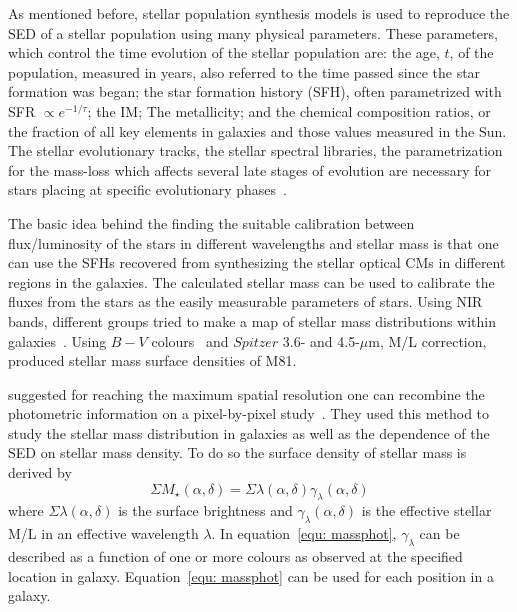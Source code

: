 As mentioned before, stellar population synthesis models is used to reproduce the SED of a stellar population using many physical parameters. 
These parameters, which control the time evolution of the stellar population are:
the age, $t$, of the population, measured in years, also referred to the time passed since the star formation was began;
the star formation history (SFH), often parametrized with SFR $\propto e^{-1/\tau}$; the IM; The metallicity; and the chemical composition ratios, or the fraction of all key elements in galaxies and those values measured in the Sun. 
The stellar evolutionary tracks, the stellar spectral libraries, the parametrization for the mass-loss which affects several late stages of evolution are necessary for stars placing at specific evolutionary phases~\citep{Courteau13}.


The basic idea behind the finding the suitable calibration between flux/luminosity of the stars in different wavelengths and stellar mass is that one can use the SFHs recovered from synthesizing the stellar optical CMs in different regions in the galaxies. 
The calculated stellar mass can be used to calibrate the fluxes from the stars as the easily measurable parameters of stars. 
Using NIR bands, different groups tried to make a map of stellar mass distributions within galaxies~\citep[e.g.,][]{Elmgreen84}.
Using $B-V$ colours~\citep{Bell01} and $Spitzer$ 3.6- and 4.5-$\mu$m, M/L correction, \cite{Kendall08} produced stellar mass surface densities of M81. 

\cite{Zibetti08} suggested for reaching the maximum spatial resolution one can recombine the photometric information on a pixel-by-pixel study~\citep{Conti03}. 
They used this method to study the stellar mass distribution in galaxies as well as the dependence of the SED on stellar mass density. 
To do so the surface density of stellar mass is derived by 
\begin{equation}
\label{equ: massphot}
\Sigma M_\star (\alpha, \delta) = \Sigma \lambda(\alpha, \delta) \gamma_{\lambda}(\alpha, \delta)
\end{equation}
where $\Sigma \lambda(\alpha, \delta)$ is the surface brightness and $\gamma_{\lambda}(\alpha, \delta)$ is the effective stellar M/L in an effective wavelength $\lambda$. 
In equation~\ref{equ: massphot},  $\gamma_{\lambda}$ can be described as a function of one or more colours as observed at the specified location in galaxy. 
Equation~\ref{equ: massphot} can be used for each position in a galaxy.


